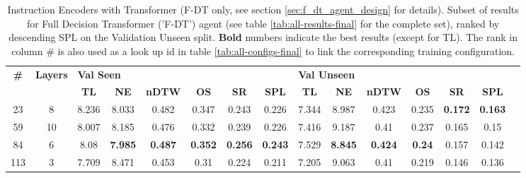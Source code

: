 \begin{table}
\centering
\caption{\label{tab:instruction_encoding_full}Instruction Encoders with Transformer (F-DT only, see section \ref{sec:f_dt_agent_design} for details). Subset of results for Full Decision Transformer ('F-DT') agent (see table \ref{tab:all-results-final} for the complete set), ranked by descending SPL on the Validation Unseen split. \textbf{Bold} numbers indicate the best results (except for TL). The rank in column \# is also used as a look up id in table \ref{tab:all-configs-final} to link the corresponding training configuration.}
\begin{tabular}{@{\hskip3pt}c@{\hskip3pt}c@{\hskip3pt}c@{\hskip3pt}c@{\hskip3pt}c@{\hskip3pt}c@{\hskip3pt}c@{\hskip3pt}c@{\hskip3pt}c@{\hskip3pt}c@{\hskip3pt}c@{\hskip3pt}c@{\hskip3pt}c@{\hskip3pt}c@{\hskip3pt}c}
\toprule
                                  \textbf{\#} & \textbf{Layers} & \multicolumn{6}{l}{\textbf{Val Seen}} & \multicolumn{6}{l}{\textbf{Val Unseen}} \\
\cmidrule(l){3-8}\cmidrule(l){9-14}\textbf{~} &      \textbf{~} &       \textbf{TL} &     \textbf{NE} &   \textbf{nDTW} &     \textbf{OS} &     \textbf{SR} &    \textbf{SPL} &         \textbf{TL} &     \textbf{NE} &   \textbf{nDTW} &    \textbf{OS} &     \textbf{SR} &    \textbf{SPL} \\
\midrule
                                           23 &               8 &             8.236 &           8.033 &           0.482 &           0.347 &           0.243 &           0.226 &               7.344 &           8.987 &           0.423 &          0.235 &  \textbf{0.172} &  \textbf{0.163} \\
                                           59 &              10 &             8.007 &           8.185 &           0.476 &           0.332 &           0.239 &           0.226 &               7.416 &           9.187 &            0.41 &          0.237 &           0.165 &            0.15 \\
                                           84 &               6 &              8.08 &  \textbf{7.985} &  \textbf{0.487} &  \textbf{0.352} &  \textbf{0.256} &  \textbf{0.243} &               7.529 &  \textbf{8.845} &  \textbf{0.424} &  \textbf{0.24} &           0.157 &           0.142 \\
                                          113 &               3 &             7.709 &           8.471 &           0.453 &            0.31 &           0.224 &           0.211 &               7.205 &           9.063 &            0.41 &          0.219 &           0.146 &           0.136 \\
\bottomrule
\end{tabular}
\end{table}
